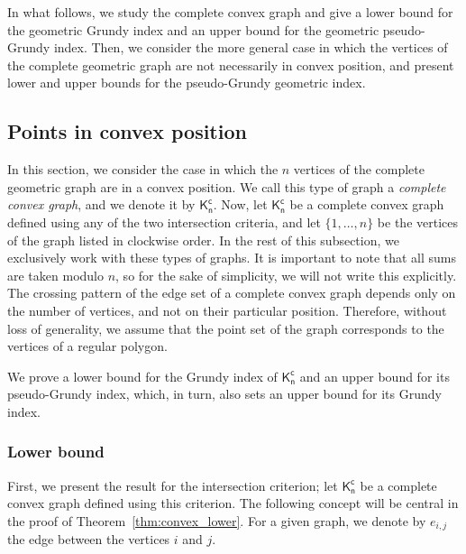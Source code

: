 \documentclass[11pt]{article}
\begin{document}
In what follows, we study the complete convex graph and give a lower bound for the geometric Grundy index and an upper bound for the geometric pseudo-Grundy index. Then, we consider the more general case in which the vertices of the complete geometric graph are not necessarily in convex position, and present lower and upper bounds for the pseudo-Grundy geometric index.
 
\subsection{Points in convex position} 

In this section, we consider the case in which the $n$ vertices of the complete geometric graph are in a convex position. We call this type of graph a \emph{complete convex  graph}, and we denote it by $\mathsf{K^{c}_{n}}$. Now, let $\mathsf{K^{c}_{n}}$ be a complete convex graph defined using any of the two intersection criteria, and let $\{1, \ldots, n\}$ be the vertices of the graph listed in clockwise order. In the rest of this subsection, we exclusively work with these types of graphs. It is important to note that all sums are taken modulo $n$, so for the sake of simplicity, we will not write this explicitly. The crossing pattern of the edge set of a complete convex graph depends only on the number of vertices, and not on their particular position. Therefore, without loss of generality, we assume that the point set of the graph corresponds to the vertices of a regular polygon.  %

We prove a lower bound for the Grundy index of $\mathsf{K^{c}_{n}}$ and an upper bound for its pseudo-Grundy index, which, in turn, also sets an upper bound for its Grundy index.

\subsubsection{Lower bound}

First, we present the result for the intersection criterion; let $\mathsf{K^{c}_{n}}$ be a complete convex graph defined using this criterion. The following concept will be central in the proof of Theorem~\ref{thm:convex_lower}. For a given graph, we denote by $e_{i,j}$ the edge between the vertices $i$ and $j$. 
\end{document}
